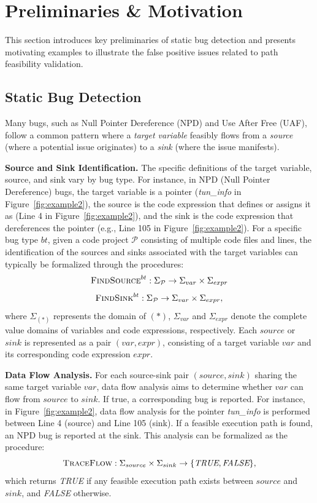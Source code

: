 


\section{Preliminaries \& Motivation}
This section introduces key preliminaries of static bug detection and presents motivating examples to illustrate the false positive issues related to path feasibility validation.

\subsection{Static Bug Detection}
Many bugs, such as Null Pointer Dereference (NPD) and Use After Free (UAF),  follow a common pattern where a \textit{target variable} feasibly flows from a \textit{source} (where a potential issue originates) to a \textit{sink} (where the issue manifests). 

\textbf{Source and Sink Identification.}
The specific definitions of the target variable, source, and sink vary by bug type. For instance, in NPD (Null Pointer Dereference) bugs, the target variable is a pointer (\eg \textit{tun\_info} in Figure~\ref{fig:example2}), the source is the code expression that defines or assigns it as \NULL (\eg Line 4 in Figure~\ref{fig:example2}), and the sink is the code expression that dereferences the pointer (e.g., Line 105 in Figure~\ref{fig:example2}). 
For a specific bug type $bt$, given a code project $\mathcal{P}$ consisting of multiple code files and lines, the identification of the sources and sinks associated with the target variables can typically be formalized through the procedures:
$$ \textsc{FindSource}^{bt}: \Sigma_\mathcal{P} \to \Sigma_{var} \times \Sigma_{expr} $$
$$ \textsc{FindSink}^{bt}: \Sigma_\mathcal{P} \to \Sigma_{var} \times \Sigma_{expr}, $$
where $\Sigma_{(*)}$ represents the domain of $(*)$, \ie $\Sigma_{var}$ and $\Sigma_{expr}$ denote the complete value domains of variables and code expressions, respectively. Each $source$ or $sink$ is represented as a pair $(var, expr)$, consisting of a target variable $var$ and its corresponding code expression $expr$.

\textbf{Data Flow Analysis.}
For each source-sink pair $(source, sink)$ sharing the same target variable $var$, data flow analysis aims to determine whether $var$ can flow from $source$ to $sink$. If true, a corresponding bug is reported. For instance, in Figure~\ref{fig:example2}, data flow analysis for the pointer \textit{tun\_info} is performed between Line 4 (source) and Line 105 (sink). If a feasible execution path is found, an NPD bug is reported at the sink. This analysis can be formalized as the procedure:   
$$ \textsc{TraceFlow}: \Sigma_{source} \times \Sigma_{sink} \to \{\textit{TRUE}, \textit{FALSE}\}, $$  
which returns \textit{TRUE} if any feasible execution path exists between $source$ and $sink$, and \textit{FALSE} otherwise.



